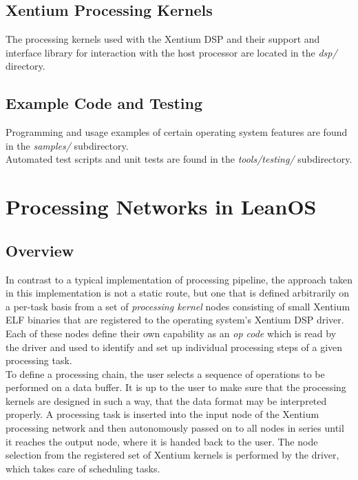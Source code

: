 \section {Xentium Processing Kernels}

The processing kernels used with the Xentium DSP and their support and interface
library for interaction with the host processor are located in the \emph{dsp/}
directory.


\section {Example Code and Testing}

Programming and usage examples of certain operating system features are found in
the \emph{samples/} subdirectory. \\

\noindent
Automated test scripts and unit tests are found in the \emph{tools/testing/}
subdirectory.












\chapter{Processing Networks in LeanOS}

\section{Overview}

In contrast to a typical implementation of processing pipeline, the approach
taken in this implementation is not a static route, but one that is defined
arbitrarily on a per-task basis from a set of \emph{processing kernel} nodes
consisting of small \gls{Xentium} \gls{ELF} binaries that are registered to the
operating system's \gls{Xentium} \gls{DSP} driver. Each of these nodes define
their own capability as an \emph{op code} which is read by the driver and used
to identify and set up individual processing steps of a given processing task.
\\

\noindent
To define a processing chain, the user selects a sequence of operations to be
performed on a data buffer. It is up to the user to make sure that the
processing kernels are designed in such a way, that the data format may be
interpreted properly.
A processing task is inserted into the input node of the Xentium
processing network and then autonomously passed on to all nodes in series until
it reaches the output node, where it is handed back to the user. The node
selection from the registered set of \gls{Xentium} kernels is performed by the
driver, which takes care of scheduling tasks.
\\

